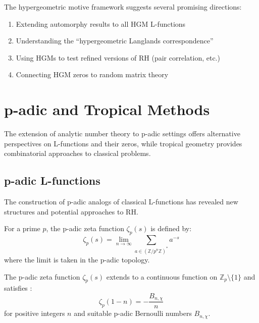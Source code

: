 The hypergeometric motive framework suggests several promising directions:
\begin{enumerate}
\item Extending automorphy results to all HGM L-functions
\item Understanding the ``hypergeometric Langlands correspondence''
\item Using HGMs to test refined versions of RH (pair correlation, etc.)
\item Connecting HGM zeros to random matrix theory
\end{enumerate}

\section{p-adic and Tropical Methods}
\label{sec:padic_tropical}

The extension of analytic number theory to p-adic settings offers alternative perspectives on L-functions and their zeros, while tropical geometry provides combinatorial approaches to classical problems.

\subsection{p-adic L-functions}

The construction of p-adic analogs of classical L-functions has revealed new structures and potential approaches to RH.

\begin{definition}
\label{def:padic_zeta}
For a prime $p$, the p-adic zeta function $\zeta_p(s)$ is defined by:
\begin{equation}
\zeta_p(s) = \lim_{n \to \infty} \sum_{a \in (\mathbb{Z}/p^n\mathbb{Z})^*} a^{-s}
\label{eq:padic_zeta}
\end{equation}
where the limit is taken in the p-adic topology.
\end{definition}

\begin{theorem}
\label{thm:kubota_leopoldt}
The p-adic zeta function $\zeta_p(s)$ extends to a continuous function on $\mathbb{Z}_p \setminus \{1\}$ and satisfies \cite{iwanieckowalski2004}:
\begin{equation}
\zeta_p(1-n) = -\frac{B_{n,\chi}}{n}
\label{eq:kubota_leopoldt}
\end{equation}
for positive integers $n$ and suitable p-adic Bernoulli numbers $B_{n,\chi}$.
\end{theorem}

